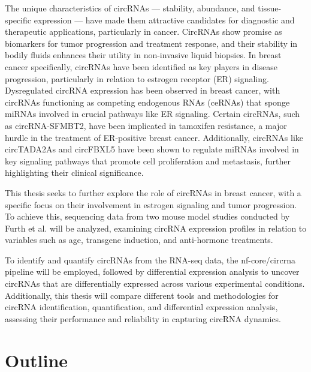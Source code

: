 The unique characteristics of circRNAs — stability, abundance, and
tissue-specific expression — have made them attractive candidates for
diagnostic and therapeutic applications, particularly in cancer.
CircRNAs show promise as biomarkers for tumor progression and treatment
response\supercite{bao_prognostic_2020,ren_construction_2017}, and their
stability in bodily fluids enhances their utility in non-invasive liquid
biopsies\supercite{bao_prognostic_2020,zhang_circular_2018}.
In breast cancer specifically, circRNAs have been identified as key players in
disease progression, particularly in relation to estrogen receptor (ER)
signaling.
Dysregulated circRNA expression has been observed in breast cancer, with
circRNAs functioning as competing endogenous RNAs (ceRNAs) that sponge miRNAs
involved in crucial pathways like ER
signaling\supercite{nair_circular_2016,xu_circrna_2022}.
Certain circRNAs, such as circRNA-SFMBT2, have been implicated in tamoxifen
resistance, a major hurdle in the treatment of ER-positive breast
cancer\supercite{li_circrna-sfmbt2_2023}.
Additionally, circRNAs like circTADA2As and circFBXL5 have been shown to
regulate miRNAs involved in key signaling pathways that promote cell
proliferation and metastasis, further highlighting their clinical
significance\supercite{xu_circtada2as_2019,gao_hsa_circrna_0006528_2019}.

This thesis seeks to further explore the role of circRNAs in breast cancer,
with a specific focus on their involvement in estrogen signaling and tumor
progression.
To achieve this, sequencing data from two mouse model studies conducted by
Furth et al.
\supercite{furth_esr1_2023,furth_overexpression_2023}
will be analyzed, examining circRNA expression profiles in relation to
variables such as age, transgene induction, and anti-hormone treatments.

To identify and quantify circRNAs from the RNA-seq data, the nf-core/circrna
pipeline\supercite{digby_nf-corecircrna_2023} will be employed, followed by
differential expression analysis to uncover circRNAs that are differentially
expressed across various experimental conditions.
Additionally, this thesis will compare different tools and methodologies for
circRNA identification, quantification, and differential expression analysis,
assessing their performance and reliability in capturing circRNA dynamics.



\section{Outline}

